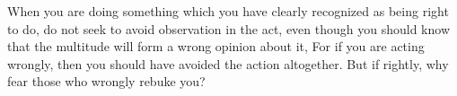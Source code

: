 When you are  doing something which you have clearly  recognized as being right
to do, do not seek to avoid observation in the act, even though you should know
that the multitude  will form a wrong  opinion about it, For if  you are acting
wrongly, then  you should have avoided  the action altogether. But  if rightly,
why fear those who wrongly rebuke you?
